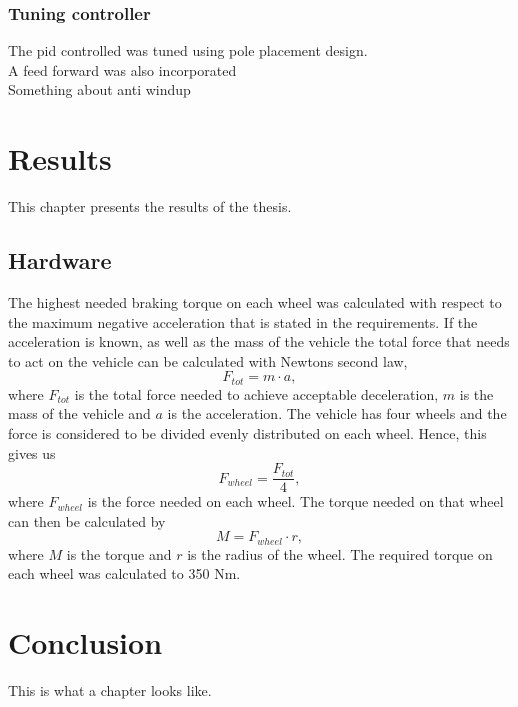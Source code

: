 \documentclass[a4paper,11pt]{kth-mag}
\begin{document}
\subsection{Tuning controller}
The \gls{pid} controlled was tuned using pole placement design. \\

A feed forward was also incorporated\\

Something about anti windup\\



\chapter{Results}
This chapter presents the results of the thesis.
\section{Hardware}
The highest needed braking torque on each wheel was calculated with respect to the maximum negative acceleration that is stated in the requirements. If the acceleration is known, as well as the mass of the vehicle the total force that needs to act on the vehicle can be calculated with Newtons second law, 
\begin{equation}
F_{tot}=m\cdot a,
\end{equation}
where $F_{tot}$ is the total force needed to achieve acceptable deceleration, $m$ is the mass of the vehicle and $a$ is the acceleration. The vehicle has four wheels and the force is considered to be divided evenly distributed on each wheel. Hence, this gives us 
\begin{equation}
F_{wheel}=\frac{F_{tot}}{4},
\end{equation}
where $F_{wheel}$ is the force needed on each wheel. The torque needed on that wheel can then be calculated by 
\begin{equation}
M=F_{wheel}\cdot r,
\end{equation}
where $M$ is the torque and $r$ is the radius of the wheel. The required torque on each wheel was calculated to 350 Nm.




\chapter{Conclusion}
This is what a chapter looks like.
\end{document}
